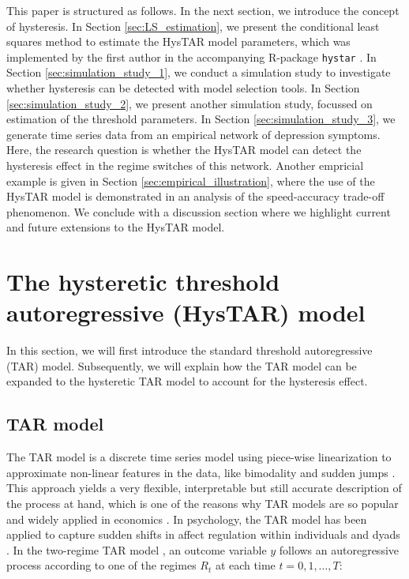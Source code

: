 \documentclass{article}
\begin{document}
This paper is structured as follows.
In the next section, we introduce the concept of hysteresis.
In Section \ref{sec:LS_estimation}, we present the conditional least squares method to estimate the HysTAR model parameters, which was implemented by the first author in the accompanying \textsf{R}-package \texttt{hystar} \citep{R, R_hystar}.
In Section \ref{sec:simulation_study_1}, we conduct a simulation study to investigate whether hysteresis can be detected with model selection tools.
In Section \ref{sec:simulation_study_2}, we present another simulation study, focussed on estimation of the threshold parameters.
In Section \ref{sec:simulation_study_3}, we generate time series data from an empirical network of depression symptoms. Here, the research question is whether the HysTAR model can detect the hysteresis effect in the regime switches of this network.
Another empricial example is given in Section \ref{sec:empirical_illustration}, where the use of the HysTAR model is demonstrated in an analysis of the speed-accuracy trade-off phenomenon.
We conclude with a discussion section where we highlight current and future extensions to the HysTAR model.

\section{The hysteretic threshold autoregressive (HysTAR) model} \label{sec:hystar}
In this section, we will first introduce the standard threshold autoregressive (TAR) model.
Subsequently, we will explain how the TAR model can be expanded to the hysteretic TAR model to account for the hysteresis effect.

\subsection{TAR model}
The TAR model is a discrete time series model using piece-wise linearization to approximate non-linear features in the data, like bimodality and sudden jumps \citep{tar}.
This approach yields a very flexible, interpretable but still accurate description of the process at hand, which is one of the reasons why TAR models are so popular and widely applied in economics \citep{tar_in_economics}.
In psychology, the TAR model has been applied to capture sudden shifts in affect regulation within individuals \citep{tar_affect_person1, tar_affect_person2} and dyads \citep{tar_affect_dyadic1, tar_affect_dyadic2}.
In the two-regime TAR model \citet{tar}, an outcome variable $y$ follows an autoregressive process according to one of the regimes $R_t$ at each time $t = 0, 1, \dots, T$:
\end{document}
